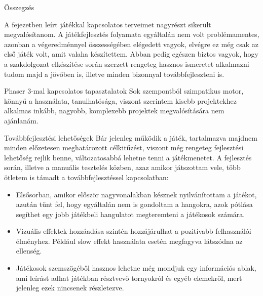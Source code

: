 \begin{MyChapter}{Összegzés}
	
	
	A  fejezetben leírt játékkal kapcsolatos terveimet nagyrészt sikerült megvalósítanom. A játékfejlesztés folyamata egyáltalán nem volt problémamentes, azonban a végeredménnyel összességében elégedett vagyok, elvégre ez még csak az első játék volt, amit valaha készítettem.
	Abban pedig egészen biztos vagyok, hogy a szakdolgozat elkészítése során szerzett rengeteg hasznos ismeretet alkalmazni tudom majd a jövőben is, illetve minden bizonnyal továbbfejleszteni is.
	
	\begin{MySection}{Phaser 3-mal kapcsolatos tapasztalatok}
		Sok szempontból szimpatikus motor, könnyű a használata, tanulhatósága, viszont szerintem kisebb projektekhez alkalmas inkább, nagyobb, komplexebb projektek megvalósítására nem ajánlanám.
	\end{MySection}
	
	\begin{MySection}{Továbbfejlesztési lehetőségek}
		Bár jelenleg működik a játék, tartalmazva majdnem minden előzetesen meghatározott célkitűzést, viszont még rengeteg fejlesztési lehetőség rejlik benne, változatosabbá lehetne tenni a játékmenetet.
		A fejlesztés során, illetve a manuális tesztelés közben, azaz amikor játszottam vele, több ötletem is támadt a továbbfejlesztéssel kapcsolatban:
		
		\begin{itemize}
			\item Elsősorban, amikor először nagyvonalakban késznek nyilvánítottam a játékot, azután tűnt fel, hogy egyáltalán nem is gondoltam a hangokra, azok pótlása segíthet egy jobb játékbeli hangulatot megteremteni a játékosok számára.
			
			\item Vizuális effektek hozzáadása szintén hozzájárulhat a pozitívabb felhasználói élményhez. Például slow effekt használata esetén megfagyva látszódna az ellenség.
			
			\item Játékosok szemszögéből hasznos lehetne még mondjuk egy információs ablak, ami leírást adhat játékban résztvevő tornyokról és egyéb elemekről, mert jelenleg ezek nincsenek részletezve.
			

\end{itemize}
\end{MySection}
\end{MyChapter}

